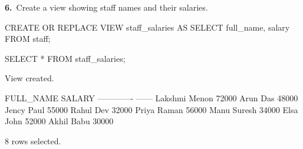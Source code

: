 \noindent\begin{minipage}{\linewidth}
\begingroup{}
{\fontsize{14}{17}\selectfont\textbf{6.}}\ Create a view showing staff names and their salaries.\par
\endgroup\vspace{12pt}


\begin{sqlcode}
CREATE OR REPLACE VIEW staff_salaries AS
SELECT full_name, salary
FROM staff;

SELECT * FROM staff_salaries;
\end{sqlcode}

\vspace{18pt}


\begin{sqlout}[fontsize=\small]
View created.

FULL_NAME      SALARY
-------------  ------
Lakshmi Menon   72000
Arun Das        48000
Jency Paul      55000
Rahul Dev       32000
Priya Raman     56000
Manu Suresh     34000
Elsa John       52000
Akhil Babu      30000

8 rows selected.
\end{sqlout}
\end{minipage}\par\vspace{24pt}

